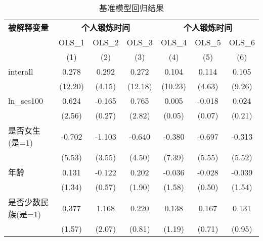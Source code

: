 \begin{table}[htbp]                          \centering
\caption{基准模型回归结果 \label{reg:tab01}}
\begin{center}
\begin{threeparttable}
\begin{tabular}{l*{6}{c}}
\toprule
\multicolumn{1}{l}{\textbf{被解释变量}}&
\multicolumn{3}{c}{\textbf{个人锻炼时间}}&
\multicolumn{3}{c}{\textbf{个人锻炼时间}}\\
\multicolumn{1}{c}{}&
\multicolumn{1}{c}{OLS\_1}&
\multicolumn{1}{c}{OLS\_2}&
\multicolumn{1}{c}{OLS\_3}&
\multicolumn{1}{c}{OLS\_4}&
\multicolumn{1}{c}{OLS\_5}&
\multicolumn{1}{c}{OLS\_6}\\
                &\multicolumn{1}{c}{(1)}         &\multicolumn{1}{c}{(2)}         &\multicolumn{1}{c}{(3)}         &\multicolumn{1}{c}{(4)}         &\multicolumn{1}{c}{(5)}         &\multicolumn{1}{c}{(6)}         \\
\midrule
interall        &    0.278\sym{***}&    0.292\sym{***}&    0.272\sym{***}&    0.104\sym{***}&    0.114\sym{***}&    0.105\sym{***}\\
                &  (12.20)         &   (4.15)         &  (12.18)         &  (10.23)         &   (4.63)         &   (9.26)         \\
ln\_ses100       &    0.624\sym{**} &   -0.165         &    0.765\sym{***}&    0.005         &   -0.018         &    0.024         \\
                &   (2.56)         &   (0.27)         &   (2.82)         &   (0.05)         &   (0.07)         &   (0.21)         \\
是否女生(是=1)  &   -0.702\sym{***}&   -1.103\sym{***}&   -0.640\sym{***}&   -0.380\sym{***}&   -0.697\sym{***}&   -0.313\sym{***}\\
                &   (5.53)         &   (3.55)         &   (4.50)         &   (7.39)         &   (5.55)         &   (5.52)         \\
年龄            &    0.131         &   -0.122         &    0.202\sym{*}  &   -0.036         &   -0.028         &   -0.039         \\
                &   (1.34)         &   (0.57)         &   (1.90)         &   (1.58)         &   (0.50)         &   (1.54)         \\
是否少数民族(是=1)&    0.377         &    1.168\sym{**} &    0.220         &    0.138         &    0.167         &    0.131         \\
                &   (1.57)         &   (2.07)         &   (0.81)         &   (1.19)         &   (0.71)         &   (0.95)         \\

\end{tabular}
\end{threeparttable}
\end{center}
\end{table}
